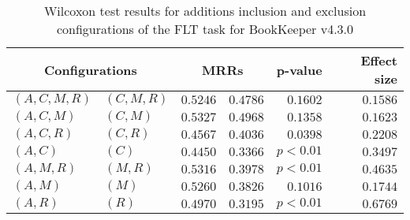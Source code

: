 
\begin{table}
\begin{spacing}{1.2}
\centering
\caption{Wilcoxon test results for additions inclusion and exclusion configurations of the FLT task for BookKeeper v4.3.0}
\label{table:versus-wilcox-bookkeeper-flt-additions}
\begin{tabular}{ll|rr|rr}
\toprule
      \multicolumn{2}{c|}{Configurations} &          \multicolumn{2}{c|}{MRRs} &       p-value & Effect size \\
\midrule
 $(A,C,M,R)$ &  $(C,M,R)$ & $0.5246$ & $0.4786$ & $0.1602$ &    $0.1586$ \\
   $(A,C,M)$ &    $(C,M)$ & $0.5327$ & $0.4968$ & $0.1358$ &    $0.1623$ \\
   $(A,C,R)$ &    $(C,R)$ & $0.4567$ & $0.4036$ & $0.0398$ &    $0.2208$ \\
     $(A,C)$ &      $(C)$ & $0.4450$ & $0.3366$ & $p<0.01$ &    $0.3497$ \\
   $(A,M,R)$ &    $(M,R)$ & $0.5316$ & $0.3978$ & $p<0.01$ &    $0.4635$ \\
     $(A,M)$ &      $(M)$ & $0.5260$ & $0.3826$ & $0.1016$ &    $0.1744$ \\
     $(A,R)$ &      $(R)$ & $0.4970$ & $0.3195$ & $p<0.01$ &    $0.6769$ \\
\bottomrule
\end{tabular}

\end{spacing}
\end{table}

